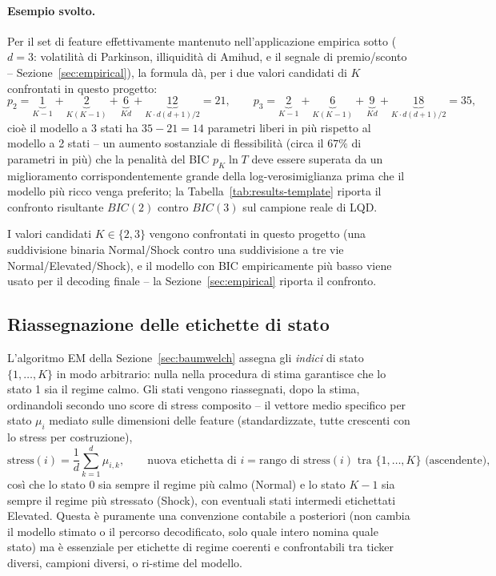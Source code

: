 \documentclass[11pt]{article}
\theoremstyle{definition}
\theoremstyle{remark}
\begin{document}
\paragraph{Esempio svolto.} Per il set di feature effettivamente mantenuto nell'applicazione empirica sotto ($d=3$: volatilit\`a di Parkinson, illiquidit\`a di Amihud, e il segnale di premio/sconto -- Sezione~\ref{sec:empirical}), la formula d\`a, per i due valori candidati di $K$ confrontati in questo progetto:
\[
p_2 = \underbrace{1}_{K-1} + \underbrace{2}_{K(K-1)} + \underbrace{6}_{Kd} + \underbrace{12}_{K\cdot d(d+1)/2} = 21,
\qquad
p_3 = \underbrace{2}_{K-1} + \underbrace{6}_{K(K-1)} + \underbrace{9}_{Kd} + \underbrace{18}_{K\cdot d(d+1)/2} = 35,
\]
cio\`e il modello a 3 stati ha $35-21=14$ parametri liberi in pi\`u rispetto al modello a 2 stati -- un aumento sostanziale di flessibilit\`a (circa il $67\%$ di parametri in pi\`u) che la penalit\`a del BIC $p_K\ln T$ deve essere superata da un miglioramento corrispondentemente grande della log-verosimiglianza prima che il modello pi\`u ricco venga preferito; la Tabella~\ref{tab:results-template} riporta il confronto risultante $BIC(2)$ contro $BIC(3)$ sul campione reale di LQD.

I valori candidati $K\in\{2,3\}$ vengono confrontati in questo progetto (una suddivisione binaria Normal/Shock contro una suddivisione a tre vie Normal/Elevated/Shock), e il modello con BIC empiricamente pi\`u basso viene usato per il decoding finale -- la Sezione~\ref{sec:empirical} riporta il confronto.

\subsection{Riassegnazione delle etichette di stato}
\label{sec:relabel}

L'algoritmo EM della Sezione~\ref{sec:baumwelch} assegna gli \emph{indici} di stato $\{1,\dots,K\}$ in modo arbitrario: nulla nella procedura di stima garantisce che lo stato 1 sia il regime calmo. Gli stati vengono riassegnati, dopo la stima, ordinandoli secondo uno score di stress composito -- il vettore medio specifico per stato $\mu_i$ mediato sulle dimensioni delle feature (standardizzate, tutte crescenti con lo stress per costruzione),
\[
\text{stress}(i) = \frac1d\sum_{k=1}^d \mu_{i,k}, \qquad
\text{nuova etichetta di } i = \text{rango di stress}(i)\text{ tra }\{1,\dots,K\}\text{ (ascendente)},
\]
cos\`i che lo stato $0$ sia sempre il regime pi\`u calmo (Normal) e lo stato $K-1$ sia sempre il regime pi\`u stressato (Shock), con eventuali stati intermedi etichettati Elevated. Questa \`e puramente una convenzione contabile a posteriori (non cambia il modello stimato o il percorso decodificato, solo quale intero nomina quale stato) ma \`e essenziale per etichette di regime coerenti e confrontabili tra ticker diversi, campioni diversi, o ri-stime del modello.
\end{document}
